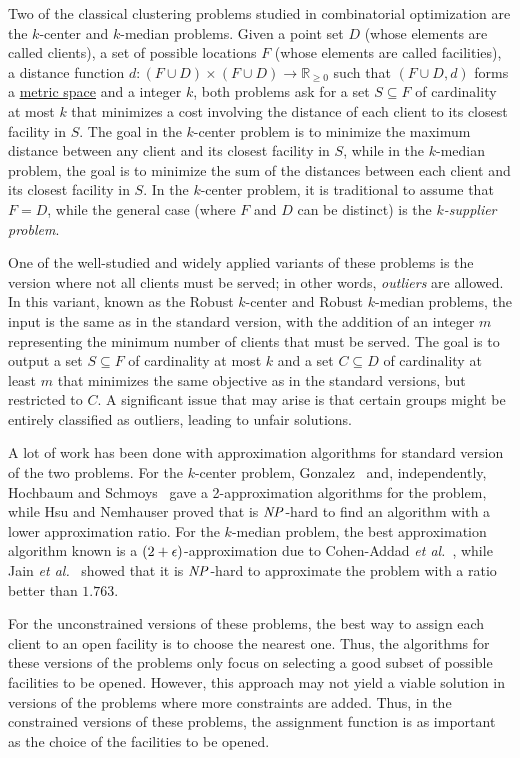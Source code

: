 \documentclass[12pt]{article}
\begin{document}
Two of the classical clustering problems studied in combinatorial optimization are the $k$-center and $k$-median problems. 
Given a point set $D$ (whose elements are called clients), a set of possible locations $F$ (whose elements are called facilities), a distance function $d : (F \cup D) \times (F \cup D) \rightarrow \mathbb{R}_{\geq 0}$ such that $(F\cup D, d)$ forms a \href{https://en.wikipedia.org/wiki/Metric_space}{metric space} and a integer $k$, both problems ask for a set $S \subseteq F$ of cardinality at most $k$ that minimizes a cost involving the distance of each client to its closest facility in $S$.
The goal in the $k$-center problem is to minimize the maximum distance between any client and its closest facility in $S$, while in the $k$-median problem, the goal is to minimize the sum of the distances between each client and its closest facility in $S$.
In the $k$-center problem, it is traditional to assume that $F=D$, while the general case (where $F$ and $D$ can be distinct) is the \emph{$k$-supplier problem}.

One of the well-studied and widely applied variants of these problems is the version where not all clients must be served; in other words, \emph{outliers} are allowed. 
In this variant, known as the Robust $k$-center and Robust $k$-median problems, the input is the same as in the standard version, with the addition of an integer $m$ representing the minimum number of clients that must be served. 
The goal is to output a set $S \subseteq F$ of cardinality at most $k$ and a set $C \subseteq D$ of cardinality at least $m$ that minimizes the same objective as in the standard versions, but restricted to $C$. A significant issue that may arise is that certain groups might be entirely classified as outliers, leading to unfair solutions.

A lot of work has been done with approximation algorithms for standard version of the two problems.
For the $k$-center problem, Gonzalez~\cite{G1985} and, independently, Hochbaum and Schmoys~\cite{HS1985} gave a 2-approximation algorithms for the problem, while Hsu and Nemhauser proved that is $\mathit{NP}$-hard to find an algorithm with a lower approximation ratio.
For the $k$-median problem, the best approximation algorithm known is a $(2 + \epsilon)$-approximation due to Cohen-Addad \emph{et al.}~\cite{CGLS2025}, while Jain \emph{et al.}~\cite{JMS2002} showed that it is $\mathit{NP}$-hard to approximate the problem with a ratio better than $1.763$.

For the unconstrained versions of these problems, the best way to assign each client to an open facility is to choose the nearest one.
Thus, the algorithms for these versions of the problems only focus on selecting a good subset of possible facilities to be opened.
However, this approach may not yield a viable solution in versions of the problems where more constraints are added.
Thus, in the constrained versions of these problems, the assignment function is as important as the choice of the facilities to be opened.
\end{document}
